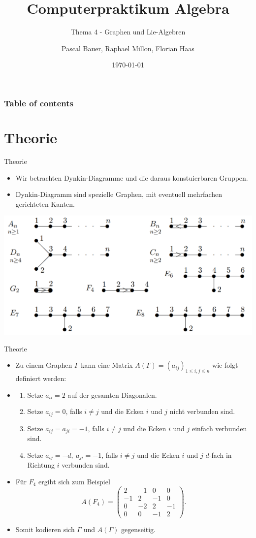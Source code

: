 \documentclass[9pt]{beamer}
\title{Computerpraktikum Algebra}
\subtitle{Thema 4 - Graphen und Lie-Algebren}
\author{Pascal Bauer, Raphael Millon, Florian Haas}
\institute{Sommersemester 2020}
\date{\today}
\begin{document}
\titlepage 

\begin{frame}
 \frametitle{Table of contents}
 \tableofcontents
\end{frame}

\section{Theorie}
\begin{frame}{Theorie}
\begin{itemize}
\item Wir betrachten Dynkin-Diagramme und die daraus konstuierbaren Gruppen.
\item Dynkin-Diagramm sind spezielle Graphen, mit eventuell mehrfachen gerichteten Kanten.
\end{itemize}
\includegraphics[width=\textwidth]{assets/dynkin.png}
\end{frame}

\begin{frame}{Theorie}
\begin{itemize}
\item Zu einem Graphen $\Gamma$ kann eine Matrix $A(\Gamma)=(a_{ij})_{1\leq i,j \leq n}$ wie folgt definiert werden:
\item \begin{enumerate}
	\item Setze $a_{ii} = 2$ auf der gesamten Diagonalen.
	\item Setze $a_{ij} = 0$, falls $i \neq j$ und die Ecken $i$ und $j$ nicht verbunden sind.
	\item Setze $a_{ij} = a_{ji} = -1$, falls $i \neq j$ und die Ecken $i$ und $j$ einfach verbunden sind.
	\item Setze $a_{ij} = -d, \ a_{ji} = -1$, falls $i \neq j$ und die Ecken $i$ und $j$ $d$-fach in Richtung $i$ verbunden sind.
	\end{enumerate}
\item Für $F_4$ ergibt sich zum Beispiel $$A(F_4)=\begin{pmatrix}2&-1&0&0\\-1&2&-1&0\\0&-2&2&-1\\0&0&-1&2\end{pmatrix}.$$
\item Somit kodieren sich $\Gamma$ und $A(\Gamma)$ gegenseitig.
\end{itemize}
\end{frame}
\end{document}
